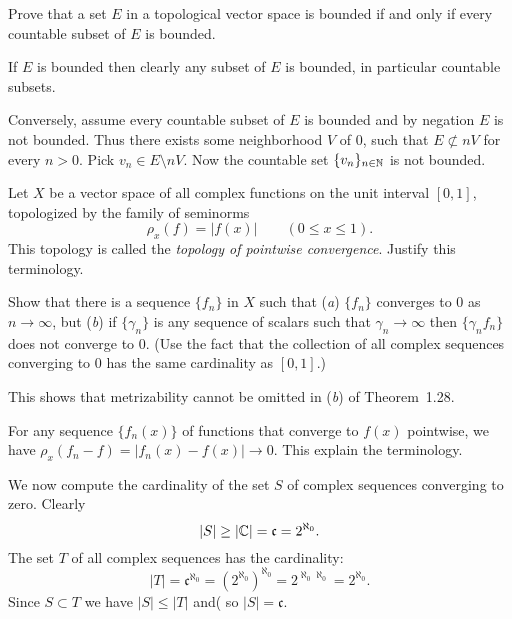 \begin{enumerate}
\begin{excopy}
Prove that a set $E$ in a topological vector space is bounded if and only if
every countable subset of $E$ is bounded.
\end{excopy}

If $E$ is bounded then clearly any subset of $E$ is bounded, 
in  particular countable subsets.

Conversely, assume every countable subset of $E$ is bounded
and by negation $E$ is not bounded.
Thus there exists some neighborhood $V$ of $0$, such that 
\(E\not\subset nV\) for every \(n > 0\).
Pick \(v_n \in E \setminus nV\). 
Now the countable set \(\{v_n\}_{n\in \mathbb{N}}\) is not bounded.

\begin{excopy}
Let $X$ be a vector space of all complex functions
on the unit interval \([0,1]\), topologized by the family of seminorms
\begin{equation*}
 \rho_x(f) = |f(x)|\qquad (0\leq x \leq 1).
\end{equation*}
This topology is called the 
\emph{topology of pointwise convergence}.
Justify this terminology.

Show that there is a sequence \(\{f_n\}\) in $X$ such that
(\emph{a}) \(\{f_n\}\) converges to $0$ as \(n\rightarrow \infty\),
but (\emph{b}) if \(\{\gamma_n\}\) is any sequence of scalars such that
\(\gamma_n \rightarrow \infty\)
then \(\{\gamma_n f_n\}\) does not converge to $0$.
(Use the fact that the collection of all complex sequences converging to $0$
has the same cardinality as \([0,1]\).)

This shows that metrizability cannot be omitted in (\emph{b}) of Theorem~1.28.
\end{excopy}


For any sequence \(\{f_n(x)\}\) of functions that converge to \(f(x)\)
pointwise, we have \(\rho_x(f_n - f) = |f_n(x) - f(x) | \rightarrow 0\).
This explain the terminology.

We now compute the cardinality of the set $S$ of complex sequences converging
to zero. Clearly 
\begin{equation*}
|S| \geq |\mathbb{C}| = \mathfrak{c} = 2^{\aleph_0}.
\end{equation*}
The set $T$ of all complex sequences has the cardinality:
\begin{equation*}
|T| = \mathfrak{c}^{\aleph_0} = \left(2^{\aleph_0}\right)^{\aleph_0}
 = 2^{\aleph_0\aleph_0} = 2^{\aleph_0}.
\end{equation*}
Since \(S\subset T\) we have \(|S|\leq |T|\) and( so \(|S| = \mathfrak{c}\).


\end{enumerate}
